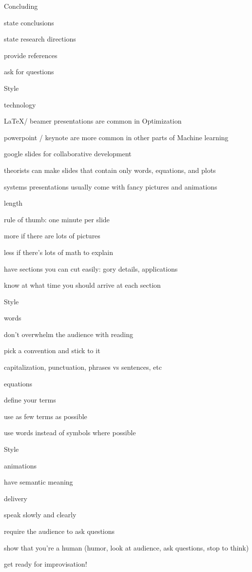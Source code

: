 \documentclass[presentation,xcolor={usenames,dvipsnames}]{beamer}
\begin{document}
\begin{frame}{Concluding}

\bit
\item state conclusions
\item state research directions
\item provide references
\item ask for questions
\eit

\end{frame}

\begin{frame}{Style}

technology
\bit
\item \LaTeX / beamer presentations are common in Optimization
\item powerpoint / keynote are more common in other parts of Machine learning
\item google slides for collaborative development
\item theorists can make slides that contain only words, equations, and plots
\item systems presentations usually come with fancy pictures and animations
\eit

length
\bit
\item rule of thumb: one minute per slide
\item more if there are lots of pictures
\item less if there's lots of math to explain
\item have sections you can cut easily: gory details, applications
\item know at what time you should arrive at each section
\eit
\end{frame}

\begin{frame}{Style}

words
\bit
\item don't overwhelm the audience with reading
\item pick a convention and stick to it
\bit \item capitalization, punctuation, phrases vs sentences, etc \eit
\eit

equations
\bit
\item define your terms
\item use as few terms as possible
\item use words instead of symbols where possible
\eit
\end{frame}

\begin{frame}{Style}

animations
\bit
\item have semantic meaning
\eit

delivery
\bit
\item speak slowly and clearly
\item require the audience to ask questions
\item show that you're a human (humor, look at audience, ask questions, stop to think)
\item get ready for improvisation!
\eit

\end{frame}
\end{document}
